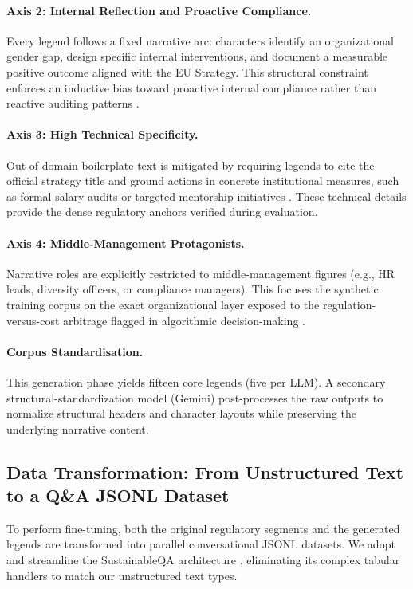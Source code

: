 \documentclass[pdflatex,sn-mathphys-num]{sn-jnl}%
\theoremstyle{thmstyleone}%
\theoremstyle{thmstyletwo}%
\theoremstyle{thmstylethree}%
\begin{document}
\paragraph{Axis 2: Internal Reflection and Proactive Compliance.} Every legend
follows a fixed narrative arc: characters identify an organizational gender gap,
design specific internal interventions, and document a measurable positive
outcome aligned with the EU Strategy. This structural constraint enforces an
inductive bias toward proactive internal compliance rather than reactive
auditing patterns \citep{sargsyan2025compliance}.

\paragraph{Axis 3: High Technical Specificity.} Out-of-domain boilerplate text
is mitigated by requiring legends to cite the official strategy title and ground
actions in concrete institutional measures, such as formal salary audits or
targeted mentorship initiatives \citep{atanasova2023faithfulness}. These
technical details provide the dense regulatory anchors verified during
evaluation.

\paragraph{Axis 4: Middle-Management Protagonists.} Narrative roles are
explicitly restricted to middle-management figures (e.g., HR leads, diversity
officers, or compliance managers). This focuses the synthetic training corpus on
the exact organizational layer exposed to the regulation-versus-cost arbitrage
flagged in algorithmic decision-making \citep{sargsyan2025compliance}.

\paragraph{Corpus Standardisation.} This generation phase yields fifteen core
legends (five per LLM). A secondary structural-standardization model (Gemini)
post-processes the raw outputs to normalize structural headers and character
layouts while preserving the underlying narrative content.

\subsection{Data Transformation: From Unstructured Text to a Q\&A JSONL Dataset}

To perform fine-tuning, both the original regulatory segments and the generated
legends are transformed into parallel conversational JSONL datasets. We adopt
and streamline the SustainableQA architecture \citep{lan2025sustainableqa},
eliminating its complex tabular handlers to match our unstructured text types.
\end{document}
